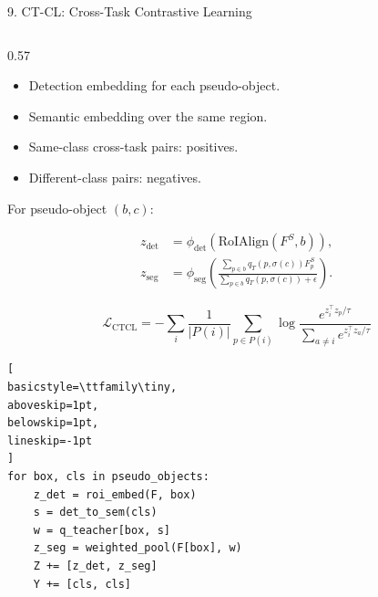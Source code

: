 \documentclass[aspectratio=169,11pt]{beamer}
\begin{document}
\begin{frame}[fragile]{9. CT-CL: Cross-Task Contrastive Learning}

\scriptsize
\setlength{\abovedisplayskip}{3pt}
\setlength{\belowdisplayskip}{3pt}
\setlength{\abovedisplayshortskip}{2pt}
\setlength{\belowdisplayshortskip}{2pt}

\begin{columns}[T,onlytextwidth]

\begin{column}{0.57\textwidth}

\begin{itemize}
  \setlength{\itemsep}{0pt}
  \setlength{\parskip}{0pt}
  \setlength{\parsep}{0pt}
  \item Detection embedding for each pseudo-object.
  \item Semantic embedding over the same region.
  \item Same-class cross-task pairs: positives.
  \item Different-class pairs: negatives.
\end{itemize}

\vspace{0.05cm}

For pseudo-object $(b,c)$:

\[
\begin{aligned}
z_{\mathrm{det}}
&=
\phi_{\mathrm{det}}
\!\left(\mathrm{RoIAlign}(F^S,b)\right),
\\[1pt]
z_{\mathrm{seg}}
&=
\phi_{\mathrm{seg}}
\!\left(
\frac{\sum_{p\in b}q_T(p,\sigma(c))F^S_p}
{\sum_{p\in b}q_T(p,\sigma(c))+\epsilon}
\right).
\end{aligned}
\]

\vspace{-0.05cm}

{\tiny
\[
\mathcal{L}_{\mathrm{CTCL}}
=
-\sum_i\frac{1}{|P(i)|}
\sum_{p\in P(i)}
\log
\frac{e^{z_i^\top z_p/\tau}}
{\sum_{a\neq i}e^{z_i^\top z_a/\tau}}
\]
}

\vspace{0.1cm}

\begin{lstlisting}[
basicstyle=\ttfamily\tiny,
aboveskip=1pt,
belowskip=1pt,
lineskip=-1pt
]
for box, cls in pseudo_objects:
    z_det = roi_embed(F, box)
    s = det_to_sem(cls)
    w = q_teacher[box, s]
    z_seg = weighted_pool(F[box], w)
    Z += [z_det, z_seg]
    Y += [cls, cls]


\end{lstlisting}
\end{column}
\end{columns}
\end{frame}
\end{document}
